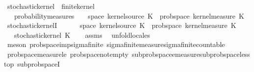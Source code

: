 \begin{isabellebody}
\ stochastic{\isacharunderscore}{\kern0pt}kernel\ {\isacharequal}{\kern0pt}\ finite{\isacharunderscore}{\kern0pt}kernel\ {\isacharplus}{\kern0pt}\isanewline
\ \ \ probability{\isacharunderscore}{\kern0pt}measures{\isacharcolon}{\kern0pt}\ {\isachardoublequoteopen}{\isasymAnd}{\isasymomega}{\isachardot}{\kern0pt}\ {\isasymomega}\ {\isasymin}\ space\ {\isacharparenleft}{\kern0pt}kernel{\isacharunderscore}{\kern0pt}source\ K{\isacharparenright}{\kern0pt}\ {\isasymLongrightarrow}\ prob{\isacharunderscore}{\kern0pt}space\ {\isacharparenleft}{\kern0pt}kernel{\isacharunderscore}{\kern0pt}measure\ K\ {\isasymomega}{\isacharparenright}{\kern0pt}{\isachardoublequoteclose}\isanewline
\isanewline
{}\isamarkupfalse%
\ stochastic{\isacharunderscore}{\kern0pt}kernelI{\isacharcolon}{\kern0pt}\isanewline
\ \ \ {\isachardoublequoteopen}{\isasymAnd}{\isasymomega}{\isachardot}{\kern0pt}\ {\isasymomega}\ {\isasymin}\ space\ {\isacharparenleft}{\kern0pt}kernel{\isacharunderscore}{\kern0pt}source\ K{\isacharparenright}{\kern0pt}\ {\isasymLongrightarrow}\ prob{\isacharunderscore}{\kern0pt}space\ {\isacharparenleft}{\kern0pt}kernel{\isacharunderscore}{\kern0pt}measure\ K\ {\isasymomega}{\isacharparenright}{\kern0pt}{\isachardoublequoteclose}\isanewline
\ \ \ {\isachardoublequoteopen}stochastic{\isacharunderscore}{\kern0pt}kernel\ K{\isachardoublequoteclose}\isanewline
%
\isadelimproof
\ \ %
\endisadelimproof
%
\isatagproof
{}\isamarkupfalse%
\ assms\ \isamarkupfalse%
\ {\isacharparenleft}{\kern0pt}unfold{\isacharunderscore}{\kern0pt}locales{\isacharparenright}{\kern0pt}\isanewline
\ \ \ \ \isamarkupfalse%
\ {\isacharparenleft}{\kern0pt}meson\ prob{\isacharunderscore}{\kern0pt}space{\isacharunderscore}{\kern0pt}imp{\isacharunderscore}{\kern0pt}sigma{\isacharunderscore}{\kern0pt}finite\ sigma{\isacharunderscore}{\kern0pt}finite{\isacharunderscore}{\kern0pt}measure{\isachardot}{\kern0pt}sigma{\isacharunderscore}{\kern0pt}finite{\isacharunderscore}{\kern0pt}countable{\isacharparenright}{\kern0pt}\isanewline
\ \ \isamarkupfalse%
\ prob{\isacharunderscore}{\kern0pt}space{\isachardot}{\kern0pt}measure{\isacharunderscore}{\kern0pt}le{\isacharunderscore}{\kern0pt}{}\ prob{\isacharunderscore}{\kern0pt}space{\isachardot}{\kern0pt}not{\isacharunderscore}{\kern0pt}empty\ subprob{\isacharunderscore}{\kern0pt}space{\isachardot}{\kern0pt}emeasure{\isacharunderscore}{\kern0pt}subprob{\isacharunderscore}{\kern0pt}space{\isacharunderscore}{\kern0pt}less{\isacharunderscore}{\kern0pt}top\ subprob{\isacharunderscore}{\kern0pt}spaceI\ \isamarkupfalse%

\end{isabellebody}
